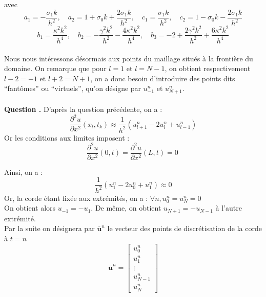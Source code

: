 \documentclass[a4,12pt]{article}
\newcommand{\ub}{\mathbf{u}}
\newcounter{Nbquestion}
\newcommand*\question{%
\stepcounter{Nbquestion}%
\textbf{Question \theNbquestion. }}
\begin{document}
  avec 
  \[ 
    a_1=-\frac{\sigma_1 k}{h^2},\quad a_2=1+\sigma_0 k+\frac{2\sigma_1 k}{h^2}, 
    \quad c_1=\frac{\sigma_1 k}{h^2},\quad c_2=1-\sigma_0 k-\frac{2\sigma_1 k}{h^2}
  \]
  \[
    b_1=\frac{\kappa^2 k^2}{h^4}, \quad b_2=-\frac{\gamma^2 k^2}{h^2}-\frac{4\kappa^2 k^2}{h^4},
    \quad b_3=-2+\frac{2\gamma^2 k^2}{h^2}+\frac{6\kappa^2 k^2}{h^4}
  \]
  ~\\

  Nous nous intéressons désormais aux points du maillage situés à la frontière du domaine. On remarque que pour $l=1$ et $l=N-1$, on obtient respectivement $l-2=-1$ et $l+2=N+1$, on a donc besoin d'introduire des points dits \enquote{fantômes} ou \enquote{virtuels}, qu'on désigne par $u_{-1}^n$ et $u_{N+1}^n$.\\
  ~\\

  \question D'après la question précédente, on a :
  \[
    \frac{\partial^2 u}{\partial x^2}(x_l,t_k)\approx \frac{1}{h^2}(u_{l+1}^n-2u_l^n+u_{l-1}^n)
  \]
  Or les conditions aux limites imposent :
  \[
    \frac{\partial^2 u}{\partial x^2}(0,t)=\frac{\partial^2 u}{\partial x^2}(L,t)=0\
  \]

  Ainsi, on a :
  \[
    \frac{1}{h^2}(u_{1}^n-2u_0^n+u_{1}^n) \approx 0
  \]
  Or, la corde étant fixée aux extrémités, on a : $\forall n, u_0^n = u_N^n = 0$\\
  On obtient alors $u_{-1}=-u_1$. De même, on obtient $u_{N+1}=-u_{N-1}$ à l'autre extrémité.\\

  Par la suite on désignera par $\overline{\ub}^n$ le vecteur des points de discrétisation de la corde à $t=n$ 
  \[
    \overline{\ub}^n=\begin{bmatrix}u_0^n\\ u_1^n\\ \vdots \\ u_{N-1}^n \\ u_N^n\end{bmatrix}
  \]
\end{document}
